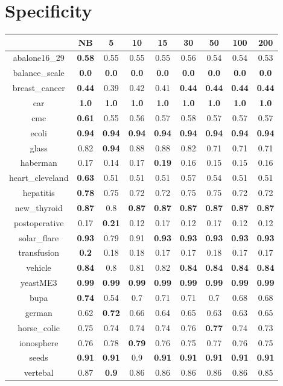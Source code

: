 \documentclass{article}%
\begin{document}
%
\section*{Specificity}%
\begin{tabular}{c|cccccccc}%
\hline%
&NB&5&10&15&30&50&100&200\\%
\hline%
abalone16\_29&\textbf{0.58}&0.55&0.55&0.55&0.56&0.54&0.54&0.53\\%
\hline%
balance\_scale&\textbf{0.0}&\textbf{0.0}&\textbf{0.0}&\textbf{0.0}&\textbf{0.0}&\textbf{0.0}&\textbf{0.0}&\textbf{0.0}\\%
\hline%
breast\_cancer&\textbf{0.44}&0.39&0.42&0.41&\textbf{0.44}&\textbf{0.44}&\textbf{0.44}&\textbf{0.44}\\%
\hline%
car&\textbf{1.0}&\textbf{1.0}&\textbf{1.0}&\textbf{1.0}&\textbf{1.0}&\textbf{1.0}&\textbf{1.0}&\textbf{1.0}\\%
\hline%
cmc&\textbf{0.61}&0.55&0.56&0.57&0.58&0.57&0.57&0.57\\%
\hline%
ecoli&\textbf{0.94}&\textbf{0.94}&\textbf{0.94}&\textbf{0.94}&\textbf{0.94}&\textbf{0.94}&\textbf{0.94}&\textbf{0.94}\\%
\hline%
glass&0.82&\textbf{0.94}&0.88&0.88&0.82&0.71&0.71&0.71\\%
\hline%
haberman&0.17&0.14&0.17&\textbf{0.19}&0.16&0.15&0.15&0.16\\%
\hline%
heart\_cleveland&\textbf{0.63}&0.51&0.51&0.51&0.57&0.54&0.51&0.51\\%
\hline%
hepatitis&\textbf{0.78}&0.75&0.72&0.72&0.75&0.75&0.72&0.72\\%
\hline%
new\_thyroid&\textbf{0.87}&0.8&\textbf{0.87}&\textbf{0.87}&\textbf{0.87}&\textbf{0.87}&\textbf{0.87}&\textbf{0.87}\\%
\hline%
postoperative&0.17&\textbf{0.21}&0.12&0.17&0.12&0.17&0.12&0.12\\%
\hline%
solar\_flare&\textbf{0.93}&0.79&0.91&\textbf{0.93}&\textbf{0.93}&\textbf{0.93}&\textbf{0.93}&\textbf{0.93}\\%
\hline%
transfusion&\textbf{0.2}&0.18&0.18&0.17&0.17&0.18&0.17&0.17\\%
\hline%
vehicle&\textbf{0.84}&0.8&0.81&0.82&\textbf{0.84}&\textbf{0.84}&\textbf{0.84}&\textbf{0.84}\\%
\hline%
yeastME3&\textbf{0.99}&\textbf{0.99}&\textbf{0.99}&\textbf{0.99}&\textbf{0.99}&\textbf{0.99}&\textbf{0.99}&\textbf{0.99}\\%
\hline%
bupa&\textbf{0.74}&0.54&0.7&0.71&0.71&0.7&0.68&0.68\\%
\hline%
german&0.62&\textbf{0.72}&0.66&0.64&0.65&0.63&0.63&0.65\\%
\hline%
horse\_colic&0.75&0.74&0.74&0.74&0.76&\textbf{0.77}&0.74&0.73\\%
\hline%
ionosphere&0.76&0.78&\textbf{0.79}&0.76&0.75&0.77&0.76&0.75\\%
\hline%
seeds&\textbf{0.91}&\textbf{0.91}&0.9&\textbf{0.91}&\textbf{0.91}&\textbf{0.91}&\textbf{0.91}&\textbf{0.91}\\%
\hline%
vertebal&0.87&\textbf{0.9}&0.86&0.86&0.86&0.86&0.86&0.85\\%
\hline%
\end{tabular}
\end{document}

